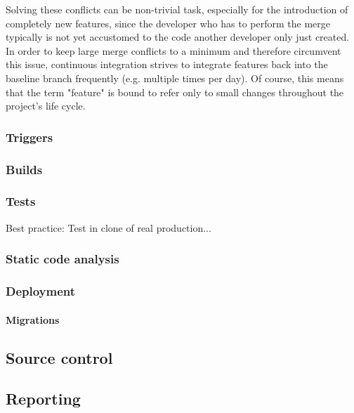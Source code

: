 Solving these conflicts can be non-trivial task, especially for the introduction
of completely new features, since the developer who has to perform the merge
typically is not yet accustomed to the code another developer only just
created.\\

In order to keep large merge conflicts to a minimum and therefore circumvent
this issue, continuous integration strives to integrate features back into the
baseline branch frequently (e.g. multiple times per day).  Of course, this means
that the term "feature" is bound to refer only to small changes throughout the
project's life cycle.

\subsubsection{Triggers}\label{sec:triggers}

\subsubsection{Builds}\label{sec:builds}

\subsubsection{Tests}\label{sec:tests}

Best practice: Test in clone of real production...

\subsubsection{Static code analysis}\label{sec:static-code-analysis}

\subsubsection{Deployment}\label{sec:deployment}

\paragraph{Migrations}\label{sec:migrations}

\subsection{Source control}\label{sec:source-control}

\subsection{Reporting}\label{sec:reporting}

